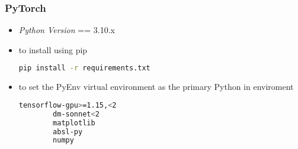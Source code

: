 \subsubsection{PyTorch}
\begin{itemize}
	\item \textit{Python Version} == 3.10.x
	\item to install using pip
	\begin{lstlisting}[language=bash]
		pip install -r requirements.txt \end{lstlisting}
	\item to set the PyEnv virtual environment as the primary Python in enviroment 
	\begin{lstlisting}[language=bash]
		tensorflow-gpu>=1.15,<2
		dm-sonnet<2
		matplotlib
		absl-py
		numpy\end{lstlisting}
\end{itemize}


